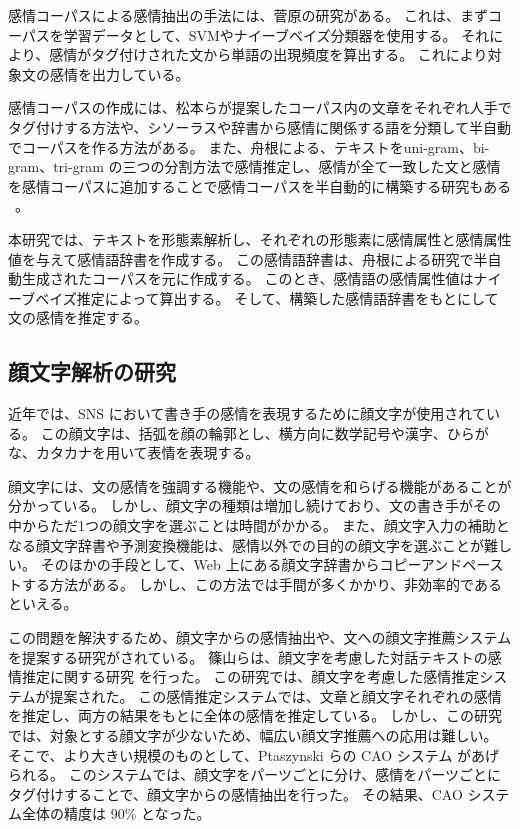 \documentclass[11pt,a4j]{jsarticle}
\begin{document}
\begin{comment}
感情属性のほかに感情属性値と感情パラメータが付与されている。
この感情属性値とは、単語がその感情属性にどれだけ帰属するかの度合いを表す。
感情パラメータとは、文中の各要素に付与された感情属性値を感情の種類ごとに合成したものを指す。
感情パラメータは、$(各感情属性の数) * (文中の格要素数 +1)$ の感情ベクトルで表現する。
\end{comment}

感情コーパスによる感情抽出の手法には、菅原の研究がある。
これは、まずコーパスを学習データとして、SVMやナイーブベイズ分類器を使用する。
それにより、感情がタグ付けされた文から単語の出現頻度を算出する。
これにより対象文の感情を出力している。

感情コーパスの作成には、松本らが提案したコーパス内の文章をそれぞれ人手でタグ付けする方法や、シソーラスや辞書から感情に関係する語を分類して半自動でコーパスを作る方法がある。
また、舟根による、テキストをuni-gram、bi-gram、tri-gram の三つの分割方法で感情推定し、感情が全て一致した文と感情を感情コーパスに追加することで感情コーパスを半自動的に構築する研究もある ~。

本研究では、テキストを形態素解析し、それぞれの形態素に感情属性と感情属性値を与えて感情語辞書を作成する。
この感情語辞書は、舟根による研究で半自動生成されたコーパスを元に作成する。
このとき、感情語の感情属性値はナイーブベイズ推定によって算出する。
そして、構築した感情語辞書をもとにして文の感情を推定する。

\subsection{顔文字解析の研究}\label{sec:kaomojichushutsu}
近年では、SNS において書き手の感情を表現するために顔文字が使用されている。
この顔文字は、括弧を顔の輪郭とし、横方向に数学記号や漢字、ひらがな、カタカナを用いて表情を表現する。

顔文字には、文の感情を強調する機能や、文の感情を和らげる機能があることが分かっている。
しかし、顔文字の種類は増加し続けており、文の書き手がその中からただ1つの顔文字を選ぶことは時間がかかる。
また、顔文字入力の補助となる顔文字辞書や予測変換機能は、感情以外での目的の顔文字を選ぶことが難しい。
そのほかの手段として、Web 上にある顔文字辞書からコピーアンドペーストする方法がある。
しかし、この方法では手間が多くかかり、非効率的であるといえる。

この問題を解決するため、顔文字からの感情抽出や、文への顔文字推薦システムを提案する研究がされている。
篠山らは、顔文字を考慮した対話テキストの感情推定に関する研究  を行った。
この研究では、顔文字を考慮した感情推定システムが提案された。
この感情推定システムでは、文章と顔文字それぞれの感情を推定し、両方の結果をもとに全体の感情を推定している。
しかし、この研究では、対象とする顔文字が少ないため、幅広い顔文字推薦への応用は難しい。
そこで、より大きい規模のものとして、Ptaszynski らの CAO システム があげられる。
このシステムでは、顔文字をパーツごとに分け、感情をパーツごとにタグ付けすることで、顔文字からの感情抽出を行った。
その結果、CAO システム全体の精度は 90\% となった。
\end{document}

